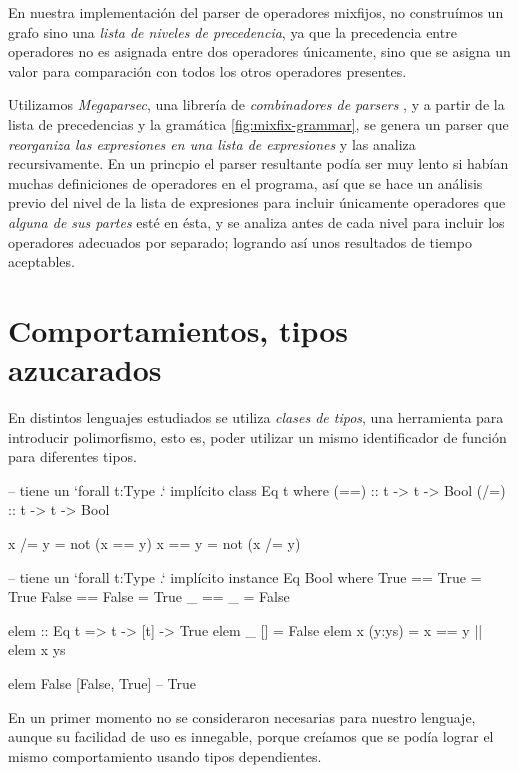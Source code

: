 {\begin{implementationfr}
En nuestra implementación del parser de operadores mixfijos, no construímos un grafo sino una \emph{lista de niveles de precedencia}, ya que la precedencia entre operadores no es asignada entre dos operadores únicamente, sino que se asigna un valor para comparación con todos los otros operadores presentes.

Utilizamos \emph{Megaparsec}, una librería de \emph{combinadores de parsers} \cite{megaparsec}, y a partir de la lista de precedencias y la gramática \ref{fig:mixfix-grammar}, se genera un parser que \emph{reorganiza las expresiones en una lista de expresiones} y las analiza recursivamente. En un princpio el parser resultante podía ser muy lento si habían muchas definiciones de operadores en el programa, así que se hace un análisis previo del nivel de la lista de expresiones para incluir únicamente operadores que \emph{alguna de sus partes} esté en ésta, y se analiza antes de cada nivel para incluir los operadores adecuados por separado; logrando así unos resultados de tiempo aceptables.
\end{implementationfr}

\section{Comportamientos, tipos azucarados}

\begin{designfr}
En distintos lenguajes estudiados se utiliza \emph{clases de tipos}, una herramienta para introducir polimorfismo, esto es, poder utilizar un mismo identificador de función para diferentes tipos.

\begin{haskellcode}
-- tiene un `forall t:Type .` implícito
class Eq t where
    (==) :: t -> t -> Bool
    (/=) :: t -> t -> Bool

    x /= y = not (x == y)
    x == y = not (x /= y)

-- tiene un `forall t:Type .` implícito
instance Eq Bool where
    True == True = True
    False == False = True
    _ == _ = False

elem :: Eq t => t -> [t] -> True
elem _ [] = False
elem x (y:ys) = x == y || elem x ys

elem False [False, True]    -- True
\end{haskellcode}

En un primer momento no se consideraron necesarias para nuestro lenguaje, aunque su facilidad de uso es innegable, porque creíamos que se podía lograr el mismo comportamiento usando tipos dependientes.


\end{designfr}}
